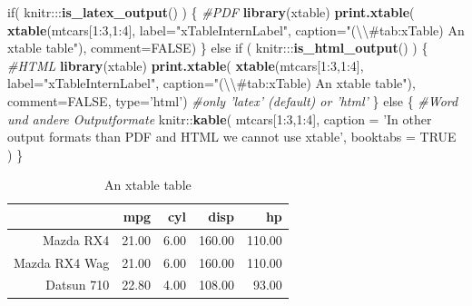 \documentclass[]{book}
\makeatletter
\newenvironment{Shaded}{\begin{snugshade}}{\end{snugshade}}
\newcommand{\KeywordTok}[1]{\textcolor[rgb]{0.13,0.29,0.53}{\textbf{{#1}}}}
\newcommand{\DataTypeTok}[1]{\textcolor[rgb]{0.13,0.29,0.53}{{#1}}}
\newcommand{\DecValTok}[1]{\textcolor[rgb]{0.00,0.00,0.81}{{#1}}}
\newcommand{\CharTok}[1]{\textcolor[rgb]{0.31,0.60,0.02}{{#1}}}
\newcommand{\StringTok}[1]{\textcolor[rgb]{0.31,0.60,0.02}{{#1}}}
\newcommand{\CommentTok}[1]{\textcolor[rgb]{0.56,0.35,0.01}{\textit{{#1}}}}
\newcommand{\OtherTok}[1]{\textcolor[rgb]{0.56,0.35,0.01}{{#1}}}
\newcommand{\NormalTok}[1]{{#1}}
\newenvironment{kframe}{%
\medskip{}
\setlength{\fboxsep}{.8em}
 \def\at@end@of@kframe{}%
 \ifinner\ifhmode%
  \def\at@end@of@kframe{\end{minipage}}%
  \begin{minipage}{\columnwidth}%
 \fi\fi%
 \def\FrameCommand##1{\hskip\@totalleftmargin \hskip-\fboxsep
 \colorbox{shadecolor}{##1}\hskip-\fboxsep
     \hskip-\linewidth \hskip-\@totalleftmargin \hskip\columnwidth}%
 \MakeFramed {\advance\hsize-\width
   \@totalleftmargin\z@ \linewidth\hsize
   \@setminipage}}%
 {\par\unskip\endMakeFramed%
 \at@end@of@kframe}
\renewenvironment{Shaded}{\begin{kframe}}{\end{kframe}}
\theoremstyle{definition}
\theoremstyle{definition}
\theoremstyle{remark}
\makeatother
\begin{document}
\begin{Shaded}
\begin{Highlighting}[]
\NormalTok{if( knitr:::}\KeywordTok{is_latex_output}\NormalTok{() ) \{}
  \CommentTok{#PDF}
  \KeywordTok{library}\NormalTok{(xtable)}
  \KeywordTok{print.xtable}\NormalTok{(}
    \KeywordTok{xtable}\NormalTok{(mtcars[}\DecValTok{1}\NormalTok{:}\DecValTok{3}\NormalTok{,}\DecValTok{1}\NormalTok{:}\DecValTok{4}\NormalTok{], }\DataTypeTok{label=}\StringTok{"xTableInternLabel"}\NormalTok{, }\DataTypeTok{caption=}\StringTok{"(}\CharTok{\textbackslash{}\textbackslash{}}\StringTok{#tab:xTable) An xtable table"}\NormalTok{), }\DataTypeTok{comment=}\OtherTok{FALSE}\NormalTok{)}
\NormalTok{\} else if ( knitr:::}\KeywordTok{is_html_output}\NormalTok{() ) \{}
  \CommentTok{#HTML}
  \KeywordTok{library}\NormalTok{(xtable)}
  \KeywordTok{print.xtable}\NormalTok{(}
    \KeywordTok{xtable}\NormalTok{(mtcars[}\DecValTok{1}\NormalTok{:}\DecValTok{3}\NormalTok{,}\DecValTok{1}\NormalTok{:}\DecValTok{4}\NormalTok{], }\DataTypeTok{label=}\StringTok{"xTableInternLabel"}\NormalTok{, }\DataTypeTok{caption=}\StringTok{"(}\CharTok{\textbackslash{}\textbackslash{}}\StringTok{#tab:xTable) An xtable table"}\NormalTok{), }\DataTypeTok{comment=}\OtherTok{FALSE}\NormalTok{,}
    \DataTypeTok{type=}\StringTok{'html'}\NormalTok{) }\CommentTok{#only 'latex' (default) or 'html'}
\NormalTok{\} else \{}
  \CommentTok{#Word und andere Outputformate  }
  \NormalTok{knitr::}\KeywordTok{kable}\NormalTok{(}
    \NormalTok{mtcars[}\DecValTok{1}\NormalTok{:}\DecValTok{3}\NormalTok{,}\DecValTok{1}\NormalTok{:}\DecValTok{4}\NormalTok{], }\DataTypeTok{caption =} \StringTok{'In other output formats than PDF and HTML we cannot use xtable'}\NormalTok{,}
    \DataTypeTok{booktabs =} \OtherTok{TRUE}
    \NormalTok{)}
\NormalTok{\}}
\end{Highlighting}
\end{Shaded}

\begin{table}[ht]
\centering
\begin{tabular}{rrrrr}
  \hline
 & mpg & cyl & disp & hp \\ 
  \hline
Mazda RX4 & 21.00 & 6.00 & 160.00 & 110.00 \\ 
  Mazda RX4 Wag & 21.00 & 6.00 & 160.00 & 110.00 \\ 
  Datsun 710 & 22.80 & 4.00 & 108.00 & 93.00 \\ 
   \hline
\end{tabular}
\caption{\label{tab:xTable} An xtable table} 
\label{xTableInternLabel}
\end{table}
\end{document}
